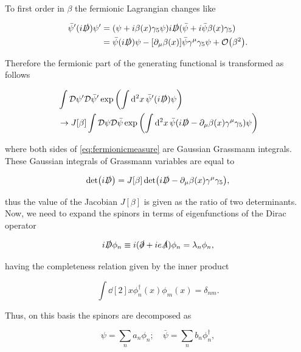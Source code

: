 To first order in $\beta$ the fermionic Lagrangian changes like


\begin{align}
	\bar\psi' (i\slashed{D})\psi'&= (\psi + i \beta(x)\gf\psi)i\slashed{D}(\bar\psi + i\bar\psi\beta(x)\gf)\nonumber\\
	&= \bar\psi (i\slashed{D})\psi - [\partial_\mu\beta(x)]\bar\psi\gmu\gf\psi + \order{\beta^2}.
\end{align}

Therefore the fermionic part of the generating functional is transformed as follows

\begin{align}
	&\int \mathcal{D}\psi' \mathcal{D}\bar\psi' \exp\qty(\int \dd[2]{x}\bar\psi' (i\slashed{D})\psi)\nonumber \\
	&\to J[\beta]\int \mathcal{D}\psi \mathcal{D}\bar\psi \exp \qty(\int \dd[2]{x}\bar\psi(i\slashed{D} - \partial_\mu\beta(x) \gamma^\mu\gamma_5)\psi)
	\label{eq:fermionicmeasure}
\end{align}

where both sides of \eqref{eq:fermionicmeasure} are Gaussian Grassmann integrals. These Gaussian integrals of Grassmann variables are equal to

\begin{equation}
\det(i\slashed{D}) = J[\beta]\det(i\slashed{D} - \partial_\mu\beta(x) \gamma^\mu\gamma_5 ),
\end{equation}

thus the value of the Jacobian $J[\beta]$ is given as the ratio of two determinants.\\

Now, we need to expand the spinors in terms of eigenfunctions of the Dirac operator

\begin{equation}
i\slashed{D}\phi_n \equiv i(\slashed{\partial} + ie\slashed{A})\phi_n = \lambda_n \phi_n,
\end{equation}

having the completeness relation given by the inner product

\begin{equation}
\int \dd[2]{x} \phi_n^\dagger(x) \phi_m(x) = \delta_{nm}.
\end{equation}

Thus, on this basis the spinors are decomposed as

\begin{equation}
\psi = \sum_n a_n \phi_n ;\quad \bar\psi = \sum_n b_n \phi_n^\dagger,
\label{eq:spinorexpansion}
\end{equation}


